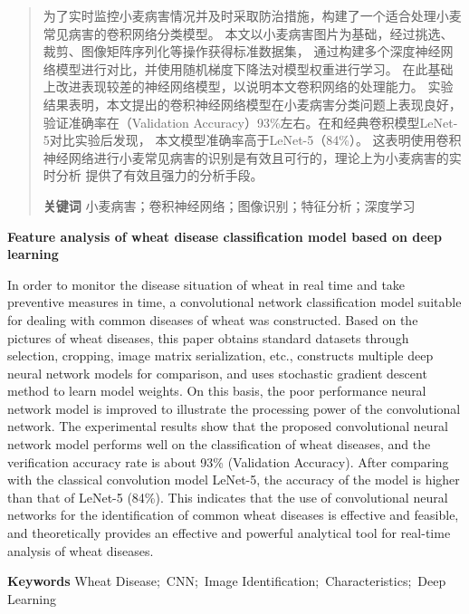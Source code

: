 \begin{abstract}
    为了实时监控小麦病害情况并及时采取防治措施，构建了一个适合处理小麦常见病害的卷积网络分类模型。
    本文以小麦病害图片为基础，经过挑选、裁剪、图像矩阵序列化等操作获得标准数据集，
    通过构建多个深度神经网络模型进行对比，并使用随机梯度下降法对模型权重进行学习。
    在此基础上改进表现较差的神经网络模型，以说明本文卷积网络的处理能力。
    实验结果表明，本文提出的卷积神经网络模型在小麦病害分类问题上表现良好，
    验证准确率在（Validation Accuracy）93\%左右。在和经典卷积模型LeNet-5对比实验后发现，
    本文模型准确率高于LeNet-5（84\%）。
    这表明使用卷积神经网络进行小麦常见病害的识别是有效且可行的，理论上为小麦病害的实时分析
    提供了有效且强力的分析手段。

    {\textbf{关键词 } \@ 小麦病害；卷积神经网络；图像识别；特征分析；深度学习}
\end{abstract}
\newpage

\begin{center}
    \fontsize{18pt}{18pt}\textbf{Feature analysis of wheat disease classification model based on deep learning}
\end{center}
\begin{enabstract}
    In order to monitor the disease situation of wheat in real time and take preventive measures in time, 
    a convolutional network classification model suitable for dealing with common diseases of wheat was constructed. 
    Based on the pictures of wheat diseases, this paper obtains standard datasets through selection, 
    cropping, image matrix serialization, etc., constructs multiple deep neural network models for comparison, 
    and uses stochastic gradient descent method to learn model weights. On this basis, the poor performance 
    neural network model is improved to illustrate the processing power of the convolutional network. 
    The experimental results show that the proposed convolutional neural network model performs well on 
    the classification of wheat diseases, and the verification accuracy rate is about 93\% 
    (Validation Accuracy). After comparing with the classical convolution model LeNet-5, 
    the accuracy of the model is higher than that of LeNet-5 (84\%). 
    This indicates that the use of convolutional neural networks for the identification of 
    common wheat diseases is effective and feasible, and theoretically provides an effective and 
    powerful analytical tool for real-time analysis of wheat diseases.

    {\textbf{Keywords } \@ Wheat Disease;\ CNN;\ Image Identification;\ Characteristics;\ Deep Learning}
\end{enabstract}
\newpage